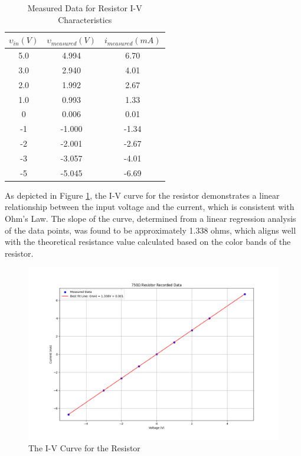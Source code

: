 \documentclass[12pt]{article}
\begin{document}
\begin{table}[H]
	\centering
	\begin{tabular}{|c|c|c|}
		\hline
		\textbf{\(\upsilon_{in} (V)\)} & \textbf{\(\upsilon_{measured} (V)\)} &
		\textbf{\(i_{measured} (mA)\)}                                                \\
		\hline
		5.0                            & 4.994                                & 6.70  \\
		3.0                            & 2.940                                & 4.01  \\
		2.0                            & 1.992                                & 2.67  \\
		1.0                            & 0.993                                & 1.33  \\
		0                              & 0.006                                & 0.01  \\
		-1                             & -1.000                               & -1.34 \\
		-2                             & -2.001                               & -2.67 \\
		-3                             & -3.057                               & -4.01 \\
		-5                             & -5.045                               & -6.69 \\
		\hline
	\end{tabular}
	\caption{Measured Data for Resistor I-V Characteristics}
	\label{tab:resistor_data}
\end{table}

As depicted in Figure \ref{fig:ex1}, the I-V curve for the resistor demonstrates a linear relationship between the input voltage and the current, which is consistent with Ohm's Law. The slope of the curve, determined from a linear regression analysis of the data points, was found to be approximately 1.338 ohms, which aligns well with the theoretical resistance value calculated based on the color bands of the resistor.
\begin{figure}[H]
	\center
	\includegraphics[width=13cm]{01_1}
	\caption{The I-V Curve for the Resistor}
	\label{fig:ex1}
\end{figure}
\end{document}
